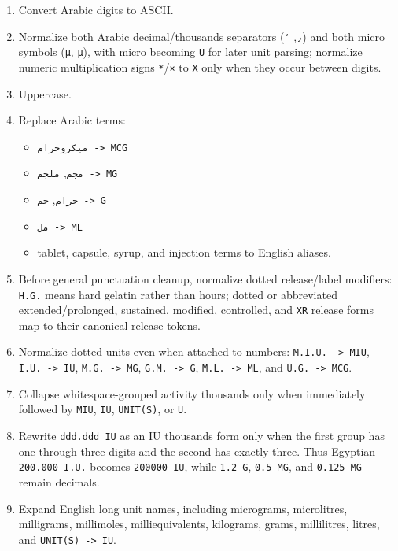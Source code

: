 \begin{enumerate}
\def\labelenumi{\arabic{enumi}.}
\tightlist
\item
  Convert Arabic digits to ASCII.
\item
  Normalize both Arabic decimal/thousands separators (\texttt{٫}, \texttt{٬}) and both micro symbols (\texttt{µ}, \texttt{μ}), with micro becoming \texttt{U} for later unit parsing; normalize numeric multiplication signs \texttt{*}/\texttt{×} to \texttt{X} only when they occur between digits.
\item
  Uppercase.
\item
  Replace Arabic terms:

  \begin{itemize}
  \tightlist
  \item
    \texttt{ميكروجرام\ -\textgreater{}\ MCG}
  \item
    \texttt{مجم}, \texttt{ملجم\ -\textgreater{}\ MG}
  \item
    \texttt{جرام}, \texttt{جم\ -\textgreater{}\ G}
  \item
    \texttt{مل\ -\textgreater{}\ ML}
  \item
    tablet, capsule, syrup, and injection terms to English aliases.
  \end{itemize}
\item
  Before general punctuation cleanup, normalize dotted release/label modifiers: \texttt{H.G.} means hard gelatin rather than hours; dotted or abbreviated extended/prolonged, sustained, modified, controlled, and \texttt{XR} release forms map to their canonical release tokens.
\item
  Normalize dotted units even when attached to numbers: \texttt{M.I.U.\ -\textgreater{}\ MIU}, \texttt{I.U.\ -\textgreater{}\ IU}, \texttt{M.G.\ -\textgreater{}\ MG}, \texttt{G.M.\ -\textgreater{}\ G}, \texttt{M.L.\ -\textgreater{}\ ML}, and \texttt{U.G.\ -\textgreater{}\ MCG}.
\item
  Collapse whitespace-grouped activity thousands only when immediately followed by \texttt{MIU}, \texttt{IU}, \texttt{UNIT(S)}, or \texttt{U}.
\item
  Rewrite \texttt{ddd.ddd\ IU} as an IU thousands form only when the first group has one through three digits and the second has exactly three. Thus Egyptian \texttt{200.000\ I.U.} becomes \texttt{200000\ IU}, while \texttt{1.2\ G}, \texttt{0.5\ MG}, and \texttt{0.125\ MG} remain decimals.
\item
  Expand English long unit names, including micrograms, microlitres, milligrams, millimoles, milliequivalents, kilograms, grams, millilitres, litres, and \texttt{UNIT(S)\ -\textgreater{}\ IU}.

\end{enumerate}
